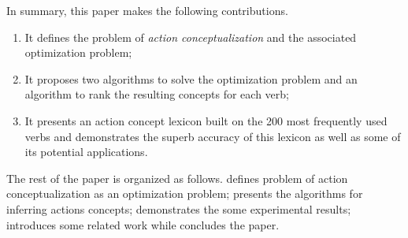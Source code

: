 In summary, this paper makes the following contributions.
\begin{enumerate}
\item It defines the problem of {\em action conceptualization} and
the associated optimization problem;
\item It proposes two algorithms to solve the optimization problem and
an algorithm to rank the resulting concepts for each verb;
\item It presents an action concept lexicon built on the 200 most frequently
used verbs and demonstrates the superb accuracy of this lexicon as
well as some of its potential applications.
\end{enumerate}

The rest of the paper is organized as follows.
 defines problem of action conceptualization as an
optimization problem;
 presents
the algorithms for inferring actions concepts;
 demonstrates the some experimental results;
 introduces some related work while
 concludes the paper.
